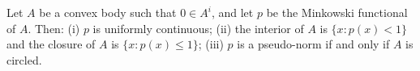 Let $A$ be a convex body such that $0 \in A^{i}$, and let $p$ be the Minkowski functional of $A$. Then: (i) $p$ is uniformly continuous; (ii) the interior of $A$ is $\{x : p(x) < 1\}$ and the closure of $A$ is $\{x : p(x) \leq 1\}$; (iii) $p$ is a pseudo-norm if and only if $A$ is circled.
